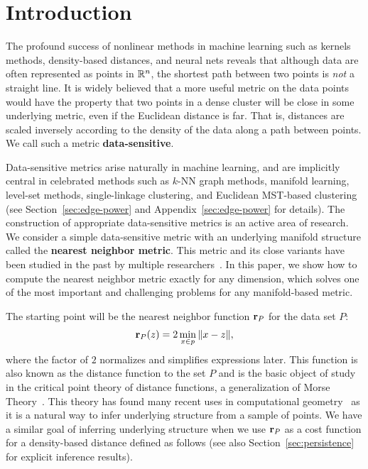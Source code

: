 \section{Introduction}

The profound success of nonlinear methods in machine learning such as kernels methods, density-based distances, and neural nets reveals that although data are often represented as points in $\mathbb{R}^n$, the shortest path between two points is \emph{not} a straight line.
It is widely believed that a more useful metric on the data points would have the property that two points in a dense cluster will be close in some underlying metric, even if the Euclidean distance is far.
That is, distances are scaled inversely according to the density of the data along a path between points.
We call such a metric \textbf{data-sensitive}.

Data-sensitive metrics arise naturally in machine learning, and are
implicitly central in celebrated methods such as $k$-NN graph methods,
manifold learning, level-set methods, single-linkage clustering, and
Euclidean MST-based clustering (see Section~\ref{sec:edge-power} and
Appendix~\ref{sec:edge-power} for details).
The construction of appropriate data-sensitive metrics is an active area of research.
We consider a simple data-sensitive metric with an underlying manifold structure called the \textbf{nearest neighbor metric}.
This metric and its close variants have been studied in the past by multiple researchers~\cite{bijral11semiSupLearningDBD,vincent03,sajama05estimatingDBDM}.
In this paper, we show how to compute the nearest neighbor metric exactly for any dimension, which solves one of the most important and challenging problems for any manifold-based metric.

The starting point will be the nearest neighbor function $\mathbf{r}_P$ for the data set $P$:
\[
\mathbf{r}_P(z) = 2\min_{x\in p} \|x-z\|,
\]
where the factor of $2$ normalizes and simplifies expressions later.
This function is also known as the distance function to the set $P$ and is the basic object of study in the critical point theory of distance functions, a generalization of Morse Theory~\cite{grove93critical}.
This theory has found many recent uses in computational geometry~\cite{chazal08smooth,chazal09sampling} as it is a natural way to infer underlying structure from a sample of points.
We have a similar goal of inferring underlying structure when we use $\mathbf{r}_P$ as a cost function for a density-based distance defined as follows (see also Section~\ref{sec:persistence} for explicit inference results).

